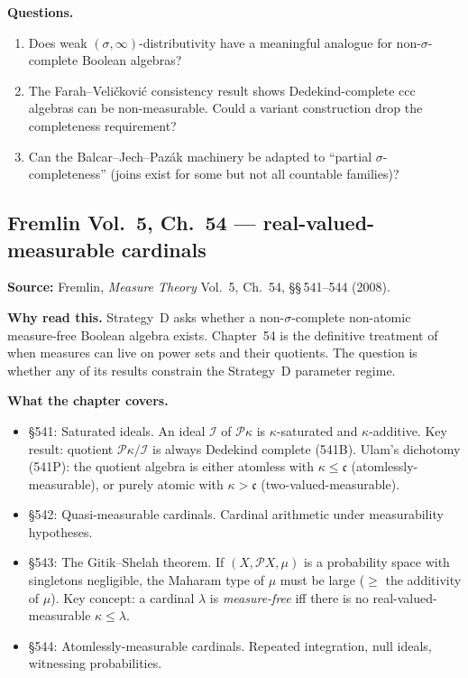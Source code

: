 \textbf{Questions.}

\begin{enumerate}[nosep]
  \item Does weak $(\sigma,\infty)$-distributivity have a meaningful
    analogue for non-$\sigma$-complete Boolean algebras?
  \item The Farah--Veli\v{c}kovi\'{c} consistency result shows
    Dedekind-complete ccc algebras can be non-measurable.  Could a
    variant construction drop the completeness requirement?
  \item Can the Balcar--Jech--Paz\'{a}k machinery be adapted to
    ``partial $\sigma$-completeness'' (joins exist for some but not
    all countable families)?
\end{enumerate}

\subsection*{Fremlin Vol.~5, Ch.~54 --- real-valued-measurable
cardinals}

\textbf{Source:} Fremlin, \emph{Measure Theory} Vol.~5, Ch.~54,
\S\S\,541--544 (2008).

\textbf{Why read this.}  Strategy~D asks whether a non-$\sigma$-complete
non-atomic measure-free Boolean algebra exists.  Chapter~54 is the
definitive treatment of when measures can live on power sets and their
quotients.  The question is whether any of its results constrain the
Strategy~D parameter regime.

\textbf{What the chapter covers.}

\begin{itemize}[nosep]
  \item \S541: Saturated ideals.  An ideal $\mathcal{I}$ of
    $\mathcal{P}\kappa$ is $\kappa$-saturated and $\kappa$-additive.
    Key result: quotient $\mathcal{P}\kappa / \mathcal{I}$ is always
    Dedekind complete (541B).  Ulam's dichotomy (541P): the quotient
    algebra is either atomless with $\kappa \leq \mathfrak{c}$
    (atomlessly-measurable), or purely atomic with $\kappa >
    \mathfrak{c}$ (two-valued-measurable).
  \item \S542: Quasi-measurable cardinals.  Cardinal arithmetic
    under measurability hypotheses.
  \item \S543: The Gitik--Shelah theorem.  If $(X, \mathcal{P}X, \mu)$
    is a probability space with singletons negligible, the Maharam
    type of $\mu$ must be large ($\geq$ the additivity of $\mu$).
    Key concept: a cardinal $\lambda$ is \emph{measure-free} iff
    there is no real-valued-measurable $\kappa \leq \lambda$.
  \item \S544: Atomlessly-measurable cardinals.  Repeated integration,
    null ideals, witnessing probabilities.
\end{itemize}

